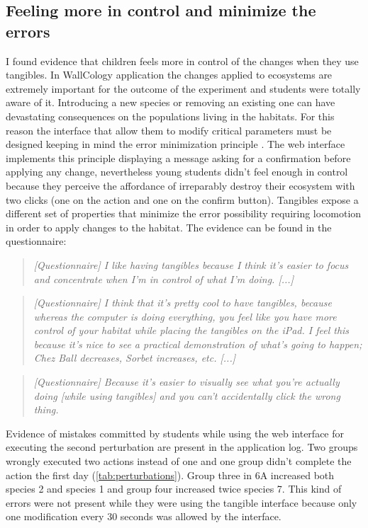 \subsection{Feeling more in control and minimize the errors}
I found evidence that children feels more in control of the changes when they use tangibles. In WallCology application the changes applied to ecosystems are extremely important for the outcome of the experiment and students were totally aware of it. Introducing a new species or removing an existing one can have devastating consequences on the populations living in the habitats. For this reason the interface that allow them to modify critical parameters must be designed keeping in mind the error minimization principle \cite{norman:design}. The web interface implements this principle displaying a message asking for a confirmation before applying any change, nevertheless young students didn't feel enough in control because they perceive the affordance \cite{norman:affordance} of irreparably destroy their ecosystem with two clicks (one on the action and one on the confirm button). Tangibles expose a different set of properties that minimize the error possibility requiring locomotion in order to apply changes to the habitat. The evidence can be found in the questionnaire:
\begin{quote}
\textit{[Questionnaire]
I like having tangibles because I think it's easier to focus and concentrate when I'm in control of what I'm doing. [...]}
\end{quote}

\begin{quote}
\textit{[Questionnaire]
I think that it's pretty cool to have tangibles, because whereas the computer is doing everything, you feel like you have more control of your habitat while placing the tangibles on the iPad. I feel this because it's nice to see a practical demonstration of what's going to happen; Chez Ball decreases, Sorbet increases, etc. [...]}
\end{quote}

\begin{quote}
\textit{[Questionnaire]
Because it's easier to visually see what you're actually doing [while using tangibles] and you can't accidentally click the wrong thing.}
\end{quote}

Evidence of mistakes committed by students while using the web interface for executing the second perturbation are present in the application log. Two groups wrongly executed two actions instead of one and one group didn't complete the action the first day (\ref{tab:perturbations}). Group three in 6A increased both species 2 and species 1 and group four increased twice species 7. This kind of errors were not present while they were using the tangible interface because only one modification every 30 seconds was allowed by the interface.

